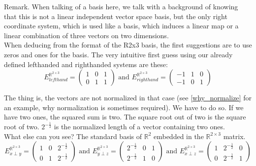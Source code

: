 \documentclass[a4paper]{article}
\begin{document}
\begin{PropositionOpt4}
Remark. When talking of a basis here, we talk with a background of knowing that this is not a linear independent vector space basis, but the only right coordinate system, which is used like a basis, which induces a linear map or a linear combination of three vectors on two dimensions.\\

When deducing from the format of the R2x3 basis, the first suggestions are to use zeros and ones for the basis. The very intuitive first guess using our already defined lefthanded and righthanded systems are these:\\

\begin{displaymath}
    E^{\mathbb{R}^{2\times{3}}}_{lefthand} = \begin{pmatrix}1&0&1\\0&1&1\end{pmatrix} \mbox{ and }
    E^{\mathbb{R}^{2\times{3}}}_{righthand} = \begin{pmatrix}-1&1&0\\-1&0&1\end{pmatrix}
\end{displaymath}

The thing is, the vectors are not normalized in that case (see \ref{why_normalize} for an example, why normalization is sometimes required). We have to do so. If we have two ones, the squared sum is two. The square root out of two is the square root of two. $2^{-\frac12}$ is the normalized length of a vector containing two ones.\\

What else can you see? The standard basis of $\mathbb{R}^{2}$ embedded in the $\mathbb{R}^{2\times3}$ matrix.\\

\begin{displaymath}
    E^{\mathbb{R}^{2\times{3}}}_{x\perp y} = \begin{pmatrix}1&0&2^{-\frac12}\\0&1&2^{-\frac12}\end{pmatrix} \mbox{ and }
    E^{\mathbb{R}^{2\times{3}}}_{y\perp z} = \begin{pmatrix}2^{-\frac12}&0&1\\2^{-\frac12}&1&0\end{pmatrix} \mbox{ and }
    E^{\mathbb{R}^{2\times{3}}}_{x\perp z} = \begin{pmatrix}1&2^{-\frac12}&0\\0&2^{-\frac12}&1\end{pmatrix} 
\end{displaymath}


\end{PropositionOpt4}
\end{document}
